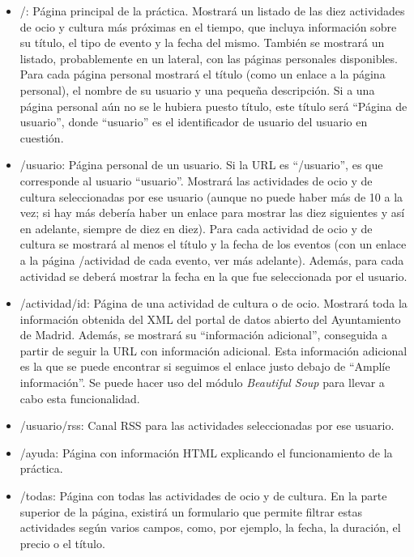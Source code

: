 \begin{itemize}
\item /: Página principal de la práctica. Mostrará un listado de las diez actividades de ocio y cultura más próximas en el tiempo, que incluya información sobre su título, el tipo de evento y la fecha del mismo. También se mostrará un listado, probablemente en un lateral, con las páginas personales disponibles. Para cada página personal mostrará el título (como un enlace a la página personal), el nombre de su usuario y una pequeña descripción. Si a una página personal aún no se le hubiera puesto título, este título será ``Página de usuario'', donde ``usuario'' es el identificador de usuario del usuario en cuestión.

\item /usuario: Página personal de un usuario. Si la URL es ``/usuario'', es que corresponde al usuario ``usuario''. Mostrará las actividades de ocio y de cultura seleccionadas por ese usuario (aunque no puede haber más de 10 a la vez; si hay más debería haber un enlace para mostrar las diez siguientes y así en adelante, siempre de diez en diez). Para cada actividad de ocio y de cultura se mostrará al menos el título y la fecha de los eventos (con un enlace a la página /actividad de cada evento, ver más adelante). Además, para cada actividad se deberá mostrar la fecha en la que fue seleccionada por el usuario.

\item /actividad/{id}: Página de una actividad de cultura o de ocio. Mostrará toda la información obtenida del XML del portal de datos abierto del Ayuntamiento de Madrid. Además, se mostrará su ``información adicional'', conseguida a partir de seguir la URL con información adicional. Esta información adicional es la que se puede encontrar si seguimos el enlace justo debajo de ``Amplíe información''. Se puede hacer uso del módulo \emph{Beautiful Soup} para llevar a cabo esta funcionalidad.

\item /usuario/rss: Canal RSS para las actividades seleccionadas por ese usuario.

\item /ayuda: Página con información HTML explicando el funcionamiento de la práctica.

\item /todas: Página con todas las actividades de ocio y de cultura. En la parte superior de la página, existirá un formulario que permite filtrar estas actividades según varios campos, como, por ejemplo, la fecha, la duración, el precio o el título.
\end{itemize}

